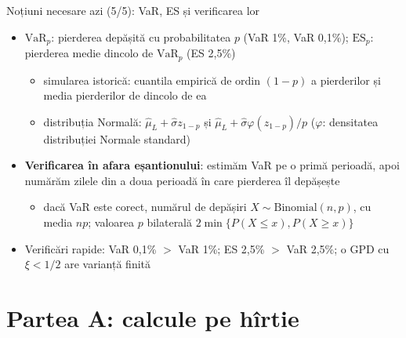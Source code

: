 \begin{frame}{Noțiuni necesare azi (5/5): VaR, ES și verificarea lor}
\itemsize{\small}
\begin{itemize}
    \item $\mathrm{VaR}_p$: pierderea depășită cu probabilitatea $p$ (VaR 1\%, VaR 0,1\%); $\mathrm{ES}_p$: pierderea medie dincolo de $\mathrm{VaR}_p$ (ES 2,5\%)
    \begin{itemize}
        \item simularea istorică: cuantila empirică de ordin $(1 - p)$ a pierderilor și media pierderilor de dincolo de ea
        \item distribuția Normală: $\hat\mu_L + \hat\sigma z_{1-p}$ și $\hat\mu_L + \hat\sigma\varphi(z_{1-p})/p$ ($\varphi$: densitatea distribuției Normale standard)
    \end{itemize}
    \item \textbf{Verificarea în afara eșantionului}: estimăm VaR pe o primă perioadă, apoi numărăm zilele din a doua perioadă în care pierderea îl depășește
    \begin{itemize}
        \item dacă VaR este corect, numărul de depășiri $X \sim \mathrm{Binomial}(n, p)$, cu media $np$; valoarea $p$ bilaterală $2\min\{P(X \le x), P(X \ge x)\}$
    \end{itemize}
    \item Verificări rapide: VaR 0,1\% $>$ VaR 1\%; ES 2,5\% $>$ VaR 2,5\%; o GPD cu $\xi < 1/2$ are varianță finită
\end{itemize}
\end{frame}


\section{Partea A: calcule pe hîrtie}

